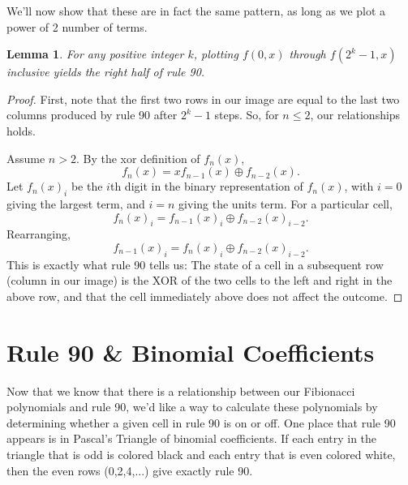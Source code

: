 \documentclass[a4paper]{article}
\newtheorem{lemma}{Lemma}
\newcommand{\xor}{\oplus}
\begin{document}
	We'll now show that these are in fact the same pattern, as long as we plot a power of 2 number of terms.
	\begin{lemma}
		For any positive integer $k$, plotting $f(0,x)$ through $f(2^k - 1,x)$ inclusive yields the right half of rule 90. 
	\end{lemma}
	\begin{proof}
		First, note that the first two rows in our image are equal to the last two columns produced by rule 90 after $2^k - 1$ steps.
		So, for $n \leq 2$, our relationships holds.
		
		Assume $n > 2$.
		By the xor definition of $f_n(x)$,
		\begin{equation*}
			f_n(x) = xf_{n-1}(x) \xor f_{n-2}(x).
		\end{equation*}
		Let $f_n(x)_i$ be the $i$th digit in the binary representation of $f_n(x)$, with $i=0$ giving the largest term, and $i=n$ giving the units term.
		For a particular cell,
		\begin{equation*}
			f_n(x)_i = f_{n-1}(x)_i \xor f_{n-2}(x)_{i-2}.
		\end{equation*}
		Rearranging,
		\begin{equation*}
			f_{n-1}(x)_i = f_n(x)_i \xor f_{n-2}(x)_{i-2}.
		\end{equation*}
		This is exactly what rule 90 tells us: The state of a cell in a subsequent row (column in our image) is the XOR of the two cells to the left and right in the above row, and that the cell immediately above does not affect the outcome.
	\end{proof}
	
	\section{Rule 90 \& Binomial Coefficients}
	Now that we know that there is a relationship between our Fibionacci polynomials and rule 90, we'd like a way to calculate these polynomials by determining whether a given cell in rule 90 is on or off.
	One place that rule 90 appears is in Pascal's Triangle of binomial coefficients.
	If each entry in the triangle that is odd is colored black and each entry that is even colored white, then the even rows (0,2,4,...) give exactly rule 90.
	
\end{document}
